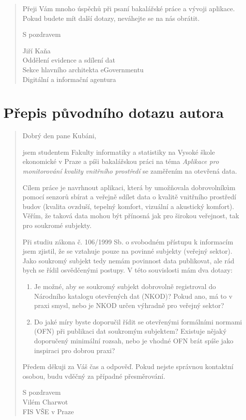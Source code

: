 \begin{quote}
Přeji Vám mnoho úspěchů při psaní bakalářské práce a vývoji aplikace. Pokud budete mít další dotazy, neváhejte se na nás obrátit.

S pozdravem

Jiří Kaňa\\
Oddělení evidence a sdílení dat\\
Sekce hlavního architekta eGovernmentu\\
Digitální a informační agentura
\end{quote}

\section*{Přepis původního dotazu autora}
\begin{quote}
Dobrý den pane Kubáni,

jsem studentem Fakulty informatiky a statistiky na Vysoké škole ekonomické v Praze a píši bakalářskou práci na téma \textit{Aplikace pro monitorování kvality vnitřního prostředí} se zaměřením na otevřená data.

Cílem práce je navrhnout aplikaci, která by umožňovala dobrovolníkům pomocí senzorů sbírat a veřejně sdílet data o kvalitě vnitřního prostředí budov (kvalita ovzduší, tepelný komfort, vizuální a akustický komfort). Věřím, že taková data mohou být přínosná jak pro širokou veřejnost, tak pro soukromé subjekty.

Při studiu zákona č. 106/1999 Sb. o svobodném přístupu k informacím jsem zjistil, že se vztahuje pouze na povinné subjekty (veřejný sektor). Jako soukromý subjekt tedy nemám povinnost data publikovat, ale rád bych se řídil osvědčenými postupy. V této souvislosti mám dva dotazy:
\begin{enumerate}
\item Je možné, aby se soukromý subjekt dobrovolně registroval do Národního katalogu otevřených dat (NKOD)? Pokud ano, má to v praxi smysl, nebo je NKOD určen výhradně pro veřejný sektor?
\item Do jaké míry byste doporučil řídit se otevřenými formálními normami (OFN) při publikaci dat soukromým subjektem? Existuje nějaký doporučený minimální rozsah, nebo je vhodné OFN brát spíše jako inspiraci pro dobrou praxi?
\end{enumerate}

Předem děkuji za Váš čas a odpověď. Pokud nejste správnou kontaktní osobou, budu vděčný za případné přesměrování.

S pozdravem\\
Vilém Charwot\\
FIS VŠE v Praze
\end{quote}
